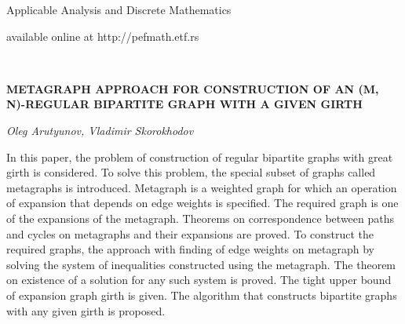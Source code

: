 \documentclass[leqno]{aadmbook}
\begin{document}
\oddsidemargin 16.5mm
\evensidemargin 16.5mm

\thispagestyle{plain}

\begin{center}
{\large \sc  Applicable Analysis and Discrete Mathematics}

{\small available online at  http:/$\!$/pefmath.etf.rs }
\end{center}

\\

\vspace{5cc}
\begin{center}

{\large\bf  METAGRAPH APPROACH FOR CONSTRUCTION OF AN (M, N)-REGULAR BIPARTITE GRAPH WITH A GIVEN GIRTH
\rule{0mm}{6mm}\renewcommand{\thefootnote}{}%


}

\vspace{1cc}
{\large\it Oleg Arutyunov, Vladimir Skorokhodov}

\vspace{1cc}
\parbox{24cc}{{\small

In this paper, the problem of construction of regular bipartite graphs with great girth is considered. To solve this problem, the special subset of graphs called metagraphs is introduced. Metagraph is a weighted graph for which an operation of expansion that depends on edge weights is specified. The required graph is one of the expansions of the metagraph. Theorems on correspondence between paths and cycles on metagraphs and their expansions are proved. To construct the required graphs, the approach with finding of edge weights on metagraph by solving the system of inequalities constructed using the metagraph. The theorem on existence of a solution for any such system is proved. The tight upper bound of expansion graph girth is given. The algorithm that constructs bipartite graphs with any given girth is proposed.

}}
\end{center}
\end{document}

